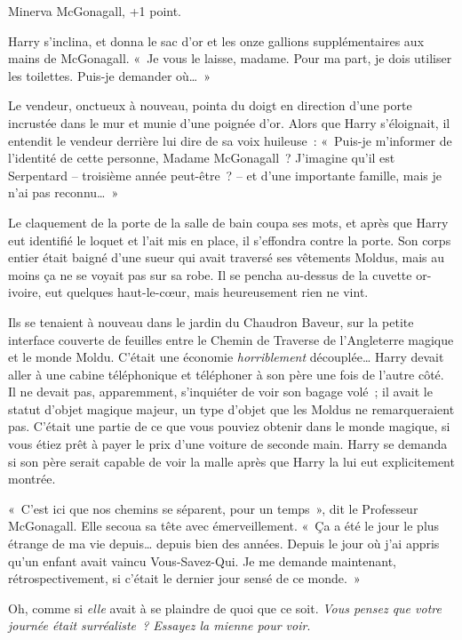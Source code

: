 Minerva McGonagall, +1 point.

Harry s'inclina, et donna le sac d'or et les onze gallions supplémentaires aux mains de McGonagall. «~Je vous le laisse, madame. Pour ma part, je dois utiliser les toilettes. Puis-je demander où…~»

Le vendeur, onctueux à nouveau, pointa du doigt en direction d'une porte incrustée dans le mur et munie d'une poignée d'or. Alors que Harry s'éloignait, il entendit le vendeur derrière lui dire de sa voix huileuse~: «~Puis-je m'informer de l'identité de cette personne, Madame McGonagall~? J'imagine qu'il est Serpentard -- troisième année peut-être~? -- et d'une importante famille, mais je n'ai pas reconnu…~»

Le claquement de la porte de la salle de bain coupa ses mots, et après que Harry eut identifié le loquet et l'ait mis en place, il s'effondra contre la porte. Son corps entier était baigné d'une sueur qui avait traversé ses vêtements Moldus, mais au moins ça ne se voyait pas sur sa robe. Il se pencha au-dessus de la cuvette or-ivoire, eut quelques haut-le-cœur, mais heureusement rien ne vint.

\later

Ils se tenaient à nouveau dans le jardin du Chaudron Baveur, sur la petite interface couverte de feuilles entre le Chemin de Traverse de l'Angleterre magique et le monde Moldu. C'était une économie \emph{horriblement} découplée… Harry devait aller à une cabine téléphonique et téléphoner à son père une fois de l'autre côté. Il ne devait pas, apparemment, s'inquiéter de voir son bagage volé~; il avait le statut d'objet magique majeur, un type d'objet que les Moldus ne remarqueraient pas. C'était une partie de ce que vous pouviez obtenir dans le monde magique, si vous étiez prêt à payer le prix d'une voiture de seconde main. Harry se demanda si son père serait capable de voir la malle après que Harry la lui eut explicitement montrée.

«~C'est ici que nos chemins se séparent, pour un temps~», dit le Professeur McGonagall. Elle secoua sa tête avec émerveillement. «~Ça a été le jour le plus étrange de ma vie depuis… depuis bien des années. Depuis le jour où j'ai appris qu'un enfant avait vaincu Vous-Savez-Qui. Je me demande maintenant, rétrospectivement, si c'était le dernier jour sensé de ce monde.~»

Oh, comme si \emph{elle} avait à se plaindre de quoi que ce soit. \emph{Vous pensez que votre journée était surréaliste~? Essayez la mienne pour voir}.

